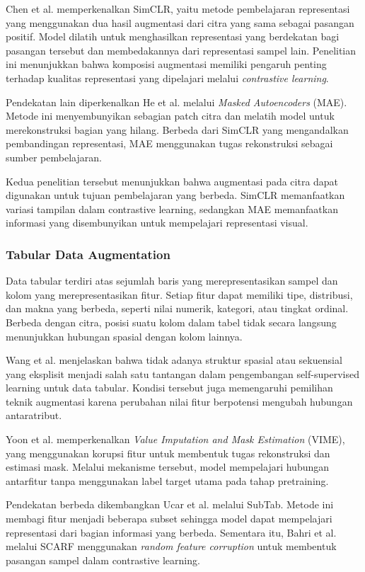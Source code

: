Chen et al. \cite{ref2} memperkenalkan SimCLR, yaitu metode pembelajaran representasi yang menggunakan dua hasil augmentasi dari citra yang sama sebagai pasangan positif. Model dilatih untuk menghasilkan representasi yang berdekatan bagi pasangan tersebut dan membedakannya dari representasi sampel lain. Penelitian ini menunjukkan bahwa komposisi augmentasi memiliki pengaruh penting terhadap kualitas representasi yang dipelajari melalui \textit{contrastive learning}.

Pendekatan lain diperkenalkan He et al. \cite{ref3} melalui \textit{Masked Autoencoders} (MAE). Metode ini menyembunyikan sebagian patch citra dan melatih model untuk merekonstruksi bagian yang hilang. Berbeda dari SimCLR yang mengandalkan pembandingan representasi, MAE menggunakan tugas rekonstruksi sebagai sumber pembelajaran.

Kedua penelitian tersebut menunjukkan bahwa augmentasi pada citra dapat digunakan untuk tujuan pembelajaran yang berbeda. SimCLR memanfaatkan variasi tampilan dalam contrastive learning, sedangkan MAE memanfaatkan informasi yang disembunyikan untuk mempelajari representasi visual.

\subsubsection{Tabular Data Augmentation}

Data tabular terdiri atas sejumlah baris yang merepresentasikan sampel dan kolom yang merepresentasikan fitur. Setiap fitur dapat memiliki tipe, distribusi, dan makna yang berbeda, seperti nilai numerik, kategori, atau tingkat ordinal. Berbeda dengan citra, posisi suatu kolom dalam tabel tidak secara langsung menunjukkan hubungan spasial dengan kolom lainnya.

Wang et al. \cite{ref4} menjelaskan bahwa tidak adanya struktur spasial atau sekuensial yang eksplisit menjadi salah satu tantangan dalam pengembangan self-supervised learning untuk data tabular. Kondisi tersebut juga memengaruhi pemilihan teknik augmentasi karena perubahan nilai fitur berpotensi mengubah hubungan antaratribut.

Yoon et al. \cite{ref5} memperkenalkan \textit{Value Imputation and Mask Estimation} (VIME), yang menggunakan korupsi fitur untuk membentuk tugas rekonstruksi dan estimasi mask. Melalui mekanisme tersebut, model mempelajari hubungan antarfitur tanpa menggunakan label target utama pada tahap pretraining.

Pendekatan berbeda dikembangkan Ucar et al. \cite{ref6} melalui SubTab. Metode ini membagi fitur menjadi beberapa subset sehingga model dapat mempelajari representasi dari bagian informasi yang berbeda. Sementara itu, Bahri et al. \cite{ref7} melalui SCARF menggunakan \textit{random feature corruption} untuk membentuk pasangan sampel dalam contrastive learning.

